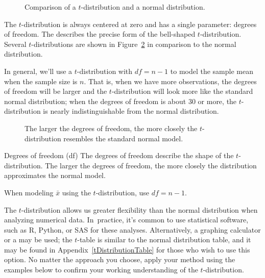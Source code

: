\begin{figure}[h]
  \centering
  \caption{Comparison of a $t$-distribution
      and a normal distribution.}
  \label{tDistCompareToNormalDist}
\end{figure}

The $t$-distribution is always centered at zero and
has a single parameter: degrees of freedom.
The 
describes the precise form of the bell-shaped $t$-distribution.
Several $t$-distributions are shown in
Figure~\ref{tDistConvergeToNormalDist}
in comparison to the normal distribution.

In general, we'll use a $t$-distribution
with $df = n - 1$ to model the sample mean
when the sample size is $n$.
That is, when we have more observations,
the degrees of freedom will be larger and
the $t$-distribution will look more like the
standard normal distribution;
when the degrees of freedom is about 30 or more,
the $t$-distribution is nearly indistinguishable
from the normal distribution.

\begin{figure}[h]
  \centering
  \caption{The larger the degrees of freedom, the more
      closely the $t$-distribution resembles the standard
      normal model.}
  \label{tDistConvergeToNormalDist}
\end{figure}

\begin{onebox}{Degrees of freedom (df)}
  The degrees of freedom describe the shape of the $t$-distribution.
  The larger the degrees of freedom, the more closely
  the distribution approximates the normal model. \stdvspace{}

  When modeling $\bar{x}$ using the $t$-distribution,
  use $df = n - 1$.
\end{onebox}


The $t$-distribution allows us greater flexibility than
the normal distribution when analyzing numerical data.
In~practice, it's common to use statistical software,
such as R, Python, or SAS for these analyses.
Alternatively, a graphing calculator or a 
may be used;
the $t$-table is similar to the normal distribution table,
and it may be found in Appendix~\ref{tDistributionTable}
for those who wish to use this option.
No matter the approach you choose, apply your method
using the examples below to confirm your working
understanding of the $t$-distribution.

